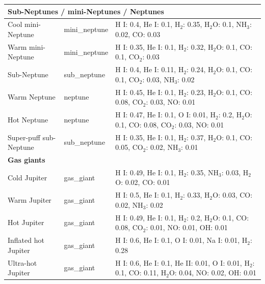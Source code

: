 \begin{longtable}{lll}
\multicolumn{3}{l}{\textbf{Sub-Neptunes / mini-Neptunes / Neptunes}} \\
\midrule
Cool mini-Neptune & mini\_neptune & H I: 0.4, He I: 0.1, H$_{2}$: 0.35, H$_{2}$O: 0.1, NH$_{3}$: 0.02, CO: 0.03 \\
Warm mini-Neptune & mini\_neptune & H I: 0.35, He I: 0.1, H$_{2}$: 0.32, H$_{2}$O: 0.1, CO: 0.1, CO$_{2}$: 0.03 \\
Sub-Neptune & sub\_neptune & H I: 0.4, He I: 0.11, H$_{2}$: 0.24, H$_{2}$O: 0.1, CO: 0.1, CO$_{2}$: 0.03, NH$_{3}$: 0.02 \\
Warm Neptune & neptune & H I: 0.45, He I: 0.1, H$_{2}$: 0.23, H$_{2}$O: 0.1, CO: 0.08, CO$_{2}$: 0.03, NO: 0.01 \\
Hot Neptune & neptune & H I: 0.47, He I: 0.1, O I: 0.01, H$_{2}$: 0.2, H$_{2}$O: 0.1, CO: 0.08, CO$_{2}$: 0.03, NO: 0.01 \\
Super-puff sub-Neptune & sub\_neptune & H I: 0.35, He I: 0.1, H$_{2}$: 0.37, H$_{2}$O: 0.1, CO: 0.05, CO$_{2}$: 0.02, NH$_{3}$: 0.01 \\
\midrule

\multicolumn{3}{l}{\textbf{Gas giants}} \\
\midrule
Cold Jupiter & gas\_giant & H I: 0.49, He I: 0.1, H$_{2}$: 0.35, NH$_{3}$: 0.03, H$_{2}$O: 0.02, CO: 0.01 \\
Warm Jupiter & gas\_giant & H I: 0.5, He I: 0.1, H$_{2}$: 0.33, H$_{2}$O: 0.03, CO: 0.02, NH$_{3}$: 0.02 \\
Hot Jupiter & gas\_giant & H I: 0.49, He I: 0.1, H$_{2}$: 0.2, H$_{2}$O: 0.1, CO: 0.08, CO$_{2}$: 0.01, NO: 0.01, OH: 0.01 \\
Inflated hot Jupiter & gas\_giant & H I: 0.6, He I: 0.1, O I: 0.01, Na I: 0.01, H$_{2}$: 0.28 \\
Ultra-hot Jupiter & gas\_giant & H I: 0.6, He I: 0.1, He II: 0.01, O I: 0.01, H$_{2}$: 0.1, CO: 0.11, H$_{2}$O: 0.04, NO: 0.02, OH: 0.01 \\
\midrule

\end{longtable}